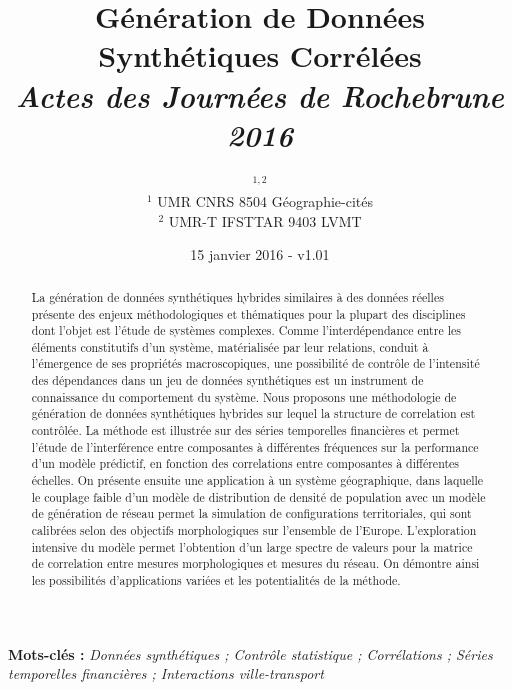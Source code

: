 


\title{\vspace{-2.5cm}Génération de Données Synthétiques Corrélées\\\medskip
\textit{Actes des Journées de Rochebrune 2016}
}
\author{$^{1,2}$\\
$^{1}$ UMR CNRS 8504 Géographie-cités\\
$^{2}$ UMR-T IFSTTAR 9403 LVMT
}
\date{15 janvier 2016 - v1.01}


\maketitle

\justify

\vspace{-0.5cm}
\begin{abstract}
La génération de données synthétiques hybrides similaires à des données réelles présente des enjeux méthodologiques et thématiques pour la plupart des disciplines dont l'objet est l'étude de systèmes complexes. Comme l'interdépendance entre les éléments constitutifs d'un système, matérialisée par leur relations, conduit à l'émergence de ses propriétés macroscopiques, une possibilité de contrôle de l'intensité des dépendances dans un jeu de données synthétiques est un instrument de connaissance du comportement du système. Nous proposons une méthodologie de génération de données synthétiques hybrides sur lequel la structure de correlation est contrôlée. La méthode est illustrée sur des séries temporelles financières et permet l'étude de l'interférence entre composantes à différentes fréquences sur la performance d'un modèle prédictif, en fonction des correlations entre composantes à différentes échelles. On présente ensuite une application à un système géographique, dans laquelle le couplage faible d'un modèle de distribution de densité de population avec un modèle de génération de réseau permet la simulation de configurations territoriales, qui sont calibrées selon des objectifs morphologiques sur l'ensemble de l'Europe. L'exploration intensive du modèle permet l'obtention d'un large spectre de valeurs pour la matrice de correlation entre mesures morphologiques et mesures du réseau. On démontre ainsi les possibilités d'applications variées et les potentialités de la méthode.
\end{abstract}

\medskip

\textbf{Mots-clés : } \textit{Données synthétiques ; Contrôle statistique ; Corrélations ; Séries temporelles financières ; Interactions ville-transport}


